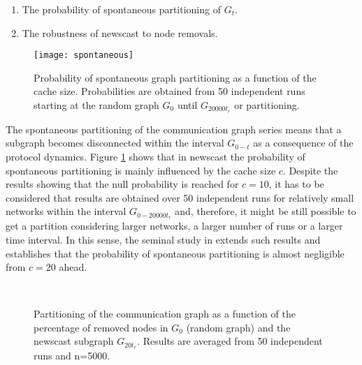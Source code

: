 \begin{enumerate}
\item The probability of spontaneous partitioning of $G_t$.
\item The robustness of newscast to node removals.
\end{enumerate}


\begin{figure}[htbp]
\centerline{\texttt{[image: spontaneous]}}
\caption{Probability of spontaneous graph partitioning as a function of the cache size. Probabilities are obtained from 50 independent runs starting at the random graph $G_0$ until $G_{20000t_r}$ or partitioning.}
\label{fig:spontaneous}
\end{figure}

The spontaneous partitioning of the communication graph series means that a subgraph becomes disconnected within the interval $G_{0-t}$ as a consequence of the protocol dynamics. Figure \ref{fig:spontaneous} shows that in newscast the probability of spontaneous partitioning is mainly influenced by the cache size $c$. Despite the results showing that the null probability is reached for $c=10$, it has to be considered that results are obtained over 50 independent runs for relatively small networks within the interval $G_{0-20000t_r}$ and, therefore, it might be still possible to get a partition considering larger networks, a larger number of runs or a larger time interval. In this sense, the seminal study in \cite{jelasity:newscast} extends such results and establishes that the probability of spontaneous partitioning is almost negligible from $c=20$ ahead.


\begin{figure*}[htbp]
\centering
{}\\
\caption{Partitioning of the communication graph as a function of the percentage of removed nodes in $G_0$ (random graph) and the newscast subgraph $G_{20t_r}$. Results are averaged from 50 independent runs and n=5000.}
\label{fig:numberclusters}
\end{figure*}

